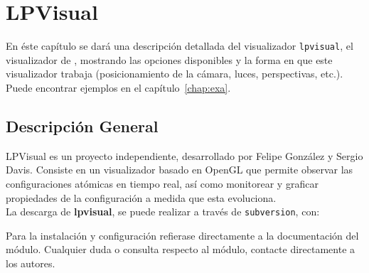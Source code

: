 \chapter{LPVisual}
\label{chap:lpvisual}

En \'este cap\'itulo se dar\'a una descripci\'on detallada del visualizador {\tt lpvisual}, el visualizador de {\lpmd}, mostrando las opciones disponibles y la forma en que este visualizador trabaja (posicionamiento de la c\'amara, luces, perspectivas, etc.). Puede encontrar ejemplos en el cap\'itulo~\ref{chap:exa}.

\section{Descripci\'on General}

LPVisual es un proyecto independiente, desarrollado por Felipe Gonz\'alez y Sergio Davis. Consiste en un visualizador basado en OpenGL que permite observar las configuraciones at\'omicas en tiempo real, as\'i como monitorear y graficar propiedades de la configuraci\'on a medida que esta evoluciona.\\


La descarga de \textbf{lpvisual}, se puede realizar a trav\'es de \verb|subversion|, con:


Para la instalaci\'on y configuraci\'on refierase directamente a la documentaci\'on del m\'odulo. Cualquier duda o consulta respecto al m\'odulo, contacte directamente a los autores.\\

